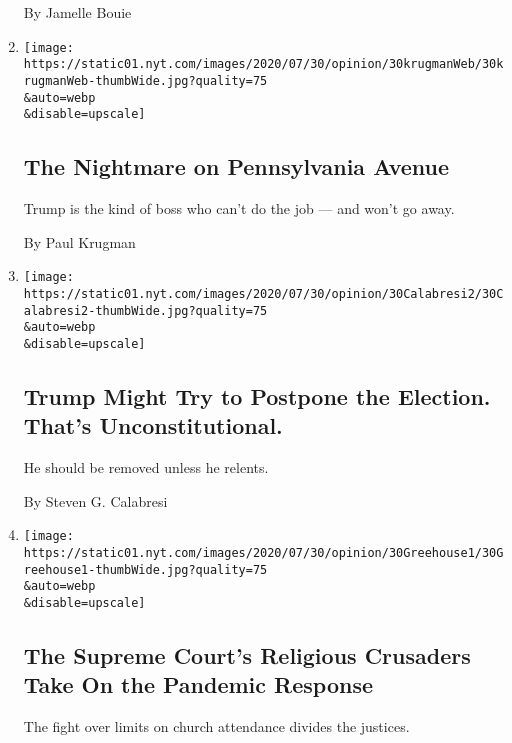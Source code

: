 \begin{enumerate}
  By Jamelle Bouie
\item
  \href{/2020/07/30/opinion/trump-coronavirus-economy.html}{}

  \texttt{[image: https://static01.nyt.com/images/2020/07/30/opinion/30krugmanWeb/30krugmanWeb-thumbWide.jpg?quality=75\\\&auto=webp\\\&disable=upscale]}

  \hypertarget{the-nightmare-on-pennsylvania-avenue}{%
  \subsection{The Nightmare on Pennsylvania
  Avenue}\label{the-nightmare-on-pennsylvania-avenue}}

  Trump is the kind of boss who can't do the job --- and won't go away.

  By Paul Krugman
\item
  \href{/2020/07/30/opinion/trump-delay-election-coronavirus.html}{}

  \texttt{[image: https://static01.nyt.com/images/2020/07/30/opinion/30Calabresi2/30Calabresi2-thumbWide.jpg?quality=75\\\&auto=webp\\\&disable=upscale]}

  \hypertarget{trump-might-try-to-postpone-the-election-thats-unconstitutional}{%
  \subsection{Trump Might Try to Postpone the Election. That's
  Unconstitutional.}\label{trump-might-try-to-postpone-the-election-thats-unconstitutional}}

  He should be removed unless he relents.

  By Steven G. Calabresi
\item
  \href{/2020/07/30/opinion/supreme-court-religion-coronavirus.html}{}

  \texttt{[image: https://static01.nyt.com/images/2020/07/30/opinion/30Greehouse1/30Greehouse1-thumbWide.jpg?quality=75\\\&auto=webp\\\&disable=upscale]}

  \hypertarget{the-supreme-courts-religious-crusaders-take-on-the-pandemic-response}{%
  \subsection{The Supreme Court's Religious Crusaders Take On the
  Pandemic
  Response}\label{the-supreme-courts-religious-crusaders-take-on-the-pandemic-response}}

  The fight over limits on church attendance divides the justices.


\end{enumerate}
